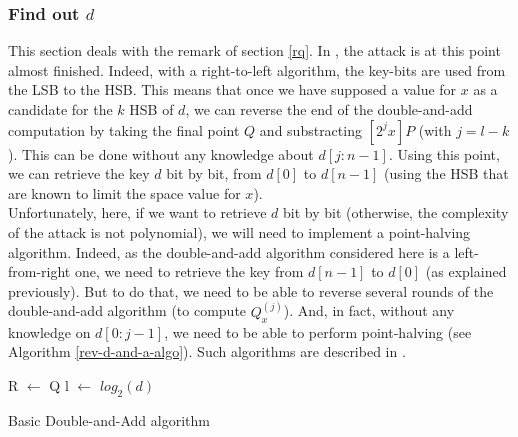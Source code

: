 \documentclass[journal]{IEEEtran}
\begin{document}
\subsubsection{Find out $d$}
\label{difficulties}
This section deals with the remark of section \ref{rq}.
In \cite{biehl2000differential}, the attack is at this point almost finished. Indeed, with a right-to-left algorithm, the key-bits are used from the LSB to the HSB. This means that 
once we have supposed a value for $x$ as a candidate for the $k$ HSB of $d$, we can reverse the end of the double-and-add computation by taking the final point 
$Q$ and substracting $[2^{j}x]P$ (with $j = l - k$). This can be done without any knowledge about $d[j:n-1]$. Using this point, we can retrieve the key $d$ bit by bit, from $d[0]$ to 
$d[n-1]$ (using the HSB that are known to limit the space value for $x$).\\

Unfortunately, here, if we want to retrieve $d$ bit by bit (otherwise, the complexity of the attack is not polynomial), we will need to implement a point-halving algorithm. 
Indeed, as the double-and-add algorithm considered here is a left-from-right one, we need to retrieve the key from $d[n-1]$ to $d[0]$ (as explained previously). But to do that, we need
to be able to reverse several rounds of the double-and-add algorithm (to compute $Q_x^{(j)}$). And, in fact, without any knowledge on $d[0:j-1]$, we need to be able to perform point-halving
(see Algorithm \ref{rev-d-and-a-algo}). Such algorithms are described in \cite{rodriguezelliptic}.

\begin{algorithm}
    \SetAlgoLined %
   
    \SetSideCommentLeft 
    \SetNoFillComment

    
    
    R $\leftarrow$ Q\;
    l $\leftarrow$ $log_2(d)$\;

    \bigskip

    \caption{Basic Double-and-Add algorithm}
    \label{rev-d-and-a-algo}

\end{algorithm}
\end{document}
